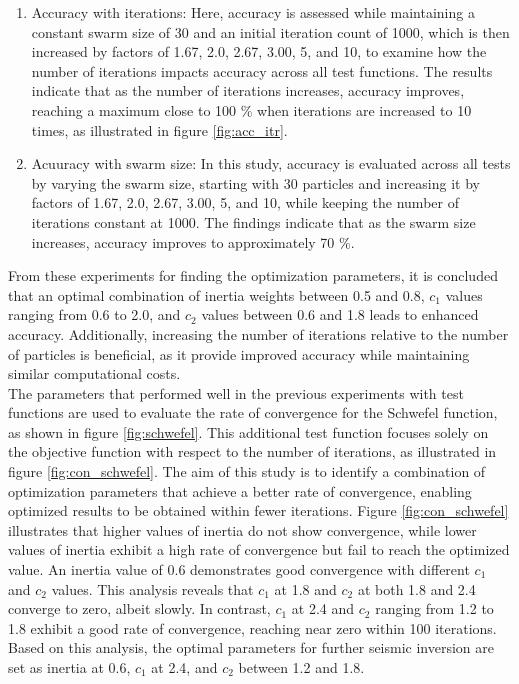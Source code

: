 \documentclass[paper,revised]{geophysics}
\begin{document}
\begin{enumerate}
	\item Accuracy with iterations: Here, accuracy is assessed while maintaining a constant swarm size of 30 and an initial iteration count of 1000, which is then increased by factors of 1.67, 2.0, 2.67, 3.00, 5, and 10, to examine how the number of iterations impacts accuracy across all test functions. The results indicate that as the number of iterations increases, accuracy improves, reaching a maximum close to 100 \% when iterations are increased to 10 times, as illustrated in figure \ref{fig:acc_itr}.
	
	\item Acuuracy with swarm size: In this study, accuracy is evaluated across all tests by varying the swarm size, starting with 30 particles and increasing it by factors of 1.67, 2.0, 2.67, 3.00, 5, and 10, while keeping the number of iterations constant at 1000. The findings indicate that as the swarm size increases, accuracy improves to approximately 70 \%.
\end{enumerate}
From these experiments for finding the optimization parameters, it is concluded that an optimal combination of inertia weights between 0.5 and 0.8, \(c_1\) values ranging from 0.6 to 2.0, and \(c_2\) values between 0.6 and 1.8 leads to enhanced accuracy. Additionally, increasing the number of iterations relative to the number of particles is beneficial, as it provide improved accuracy while maintaining similar computational costs.
\\
The parameters that performed well in the previous experiments with test functions are used to evaluate the rate of convergence for the Schwefel function, as shown in figure \ref{fig:schwefel}. This additional test function focuses solely on the objective function with respect to the number of iterations, as illustrated in figure \ref{fig:con_schwefel}. The aim of this study is to identify a combination of optimization parameters that achieve a better rate of convergence, enabling optimized results to be obtained within fewer iterations. Figure \ref{fig:con_schwefel} illustrates that higher values of inertia do not show convergence, while lower values of inertia exhibit a high rate of convergence but fail to reach the optimized value. An inertia value of 0.6 demonstrates good convergence with different \(c_1\) and \(c_2\) values. This analysis reveals that \(c_1\) at 1.8 and \(c_2\) at both 1.8 and 2.4 converge to zero, albeit slowly. In contrast, \(c_1\) at 2.4 and \(c_2\) ranging from 1.2 to 1.8 exhibit a good rate of convergence, reaching near zero within 100 iterations. Based on this analysis, the optimal parameters for further seismic inversion are set as inertia at 0.6, \(c_1\) at 2.4, and \(c_2\) between 1.2 and 1.8.
\end{document}
